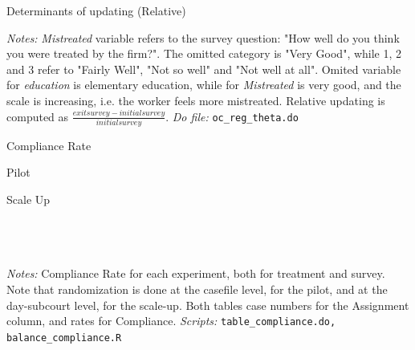 \documentclass[11pt]{article}
\begin{document}
\begin{landscape}
\begin{table}[H]
\caption{Determinants of updating (Relative)}
\label{Table_determinants_updating}
\begin{center}
\scriptsize{}
\end{center}
 \footnotesize
\textit{Notes:} 
\emph{Mistreated} variable refers to the survey question: "How well do you think you were treated by the firm?". The omitted category is "Very Good", while 1, 2 and 3 refer to "Fairly Well", "Not so well" and "Not well at all".
Omited variable for \emph{education} is elementary education, while for \emph{Mistreated} is very good, and the scale is increasing, i.e. the worker feels more mistreated. Relative updating is computed as $\frac{exitsurvey-initialsurvey}{initialsurvey}$.
\textit{Do file: } \texttt{oc\_reg\_theta.do}
\end{table}
\end{landscape}


\begin{table}[H]
    \caption{Compliance Rate}
    \label{Table_compliance}
    \begin{subtable}{1\textwidth}
      \centering
        \caption{Pilot}
        \scriptsize{}
    \end{subtable}%
    
    \bigskip
    \begin{subtable}{1\textwidth}
      \centering
        \caption{Scale Up}
        \scriptsize{}
    \end{subtable}
           \footnotesize
           \\
           \\
           \\
  \textit{Notes:} 
    Compliance Rate for each experiment, both for treatment and survey. Note that randomization is done at the casefile level, for the pilot, and at the day-subcourt level, for the scale-up. Both tables case numbers for the Assignment column, and rates for Compliance.
    \textit{Scripts: } \texttt{table\_compliance.do, balance\_compliance.R}
\end{table}
\end{document}

